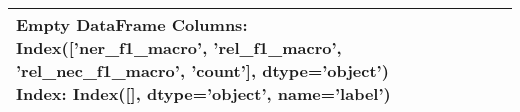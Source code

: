 \begin{tabular}{lrrrr}
\toprule
Empty DataFrame
Columns: Index(['ner\_f1\_macro', 'rel\_f1\_macro', 'rel\_nec\_f1\_macro', 'count'], dtype='object')
Index: Index([], dtype='object', name='label') \\
\bottomrule
\end{tabular}
